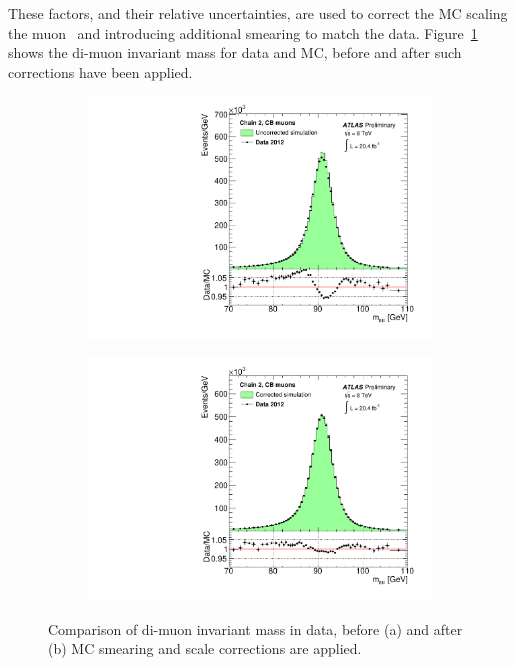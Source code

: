 These factors, and their relative uncertainties, are used to correct the MC scaling the muon \pt\ and introducing additional smearing to match the data. Figure~\ref{fig:OBmuRes} shows the di-muon invariant mass for data and MC, before and after such corrections have been applied.

\begin{figure}[tb!] %
\centering
\begin{subfigure}{0.38\textwidth}
\includegraphics[width=\textwidth]{Objects/Figures/fig_14a__lineshapeBefore.pdf}
\caption{}
\end{subfigure}
\begin{subfigure}{0.38\textwidth}
\includegraphics[width=\textwidth]{Objects/Figures/fig_14b__lineshapeAfter.pdf}
\caption{}
\end{subfigure}
\caption{Comparison of di-muon invariant mass in data, before (a) and after (b) MC smearing and scale corrections are applied.}
\label{fig:OBmuRes}
\end{figure} 

